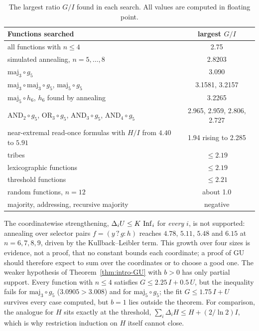 \begin{table}[ht]
\centering\small
\begin{tabular}{lc}
\toprule
Functions searched & largest $G/I$\\
\midrule
all functions with $n\le4$ & 2.75\\
simulated annealing, $n=5,\dots,8$ & 2.8203\\
$\mathrm{maj}_3\circ g_5$ & 3.090\\
$\mathrm{maj}_3\circ\mathrm{maj}_3\circ g_5$, $\mathrm{maj}_5\circ g_5$ & 3.1581, 3.2157\\
$\mathrm{maj}_5\circ h_6$, $h_6$ found by annealing & 3.2265\\
$\mathrm{AND}_2\circ g_5$, $\mathrm{OR}_3\circ g_5$, $\mathrm{AND}_3\circ g_5$, $\mathrm{AND}_4\circ g_5$ & 2.965, 2.959, 2.806, 2.727\\
near-extremal read-once formulas with $H/I$ from $4.40$ to $5.91$ & 1.94 rising to 2.285\\
tribes & $\le2.19$\\
lexicographic functions & $\le2.19$\\
threshold functions & $\le2.21$\\
random functions, $n=12$ & about 1.0\\
majority, addressing, recursive majority & negative\\
\bottomrule
\end{tabular}
\caption{The largest ratio $G/I$ found in each search. All values are computed in floating point.}
\label{tab:GU}
\end{table}

The coordinatewise strengthening, $\Delta_iU\le K\,\operatorname{Inf}_i$ for \emph{every} $i$, is not supported: annealing over selector pairs $f=(y\,?\,g:h)$ reaches $4.78$, $5.11$, $5.48$ and $6.15$ at $n=6,7,8,9$, driven by the Kullback--Leibler term. This growth over four sizes is evidence, not a proof, that no constant bounds each coordinate; a proof of GU should therefore expect to sum over the coordinates or to choose a good one. The weaker hypothesis of Theorem~\ref{thm:intro-GU} with $b>0$ has only partial support. Every function with $n\le4$ satisfies $G\le2.25\,I+0.5\,U$, but the inequality fails for $\mathrm{maj}_3\circ g_5$ ($3.0905>3.008$) and for $\mathrm{maj}_5\circ g_5$; the fit $G\le1.75\,I+U$ survives every case computed, but $b=1$ lies outside the theorem. For comparison, the analogue for $H$ sits exactly at the threshold, $\sum_i\Delta_iH\le H+(2/\ln2)I$, which is why restriction induction on $H$ itself cannot close.


